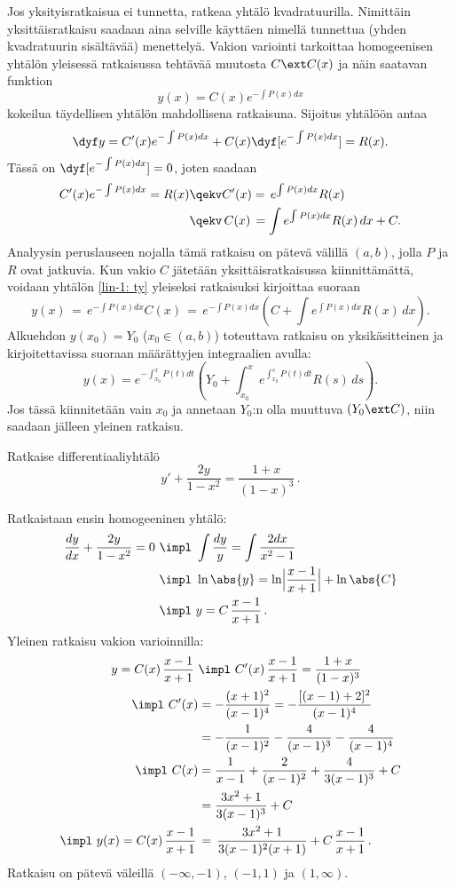 Jos yksityisratkaisua ei tunnetta, ratkeaa yhtälö  kvadratuurilla. Nimittäin 
yksittäisratkaisu saadaan aina selville käyttäen 
 nimellä tunnettua 
(yhden kvadratuurin sisältävää) menettelyä. Vakion variointi tarkoittaa homogeenisen yhtälön
yleisessä ratkaisussa tehtävää muutosta $C \ext C(x)$ ja näin saatavan funktion
\[
y(x)=C(x)e^{-\int P(x)dx}
\]
kokeilua täydellisen yhtälön mahdollisena ratkaisuna. Sijoitus yhtälöön antaa
\[
\dyf y=C'(x)e^{-\int P(x)dx}+C(x)\dyf[e^{-\int P(x)dx}]=R(x).
\]
Tässä on $\dyf[e^{-\int P(x)dx}]=0$, joten saadaan
\begin{align*}
C'(x)e^{-\int P(x)dx} = R(x) &\qekv C'(x)  = \,e^{\int P(x)dx} R(x) \\
                             &\qekv\,C(x)\,= \int e^{\int P(x)dx}R(x)\,dx+C.
\end{align*}
Analyysin peruslauseen nojalla tämä ratkaisu on pätevä välillä $(a,b)$, jolla $P$ ja $R$ ovat
jatkuvia. Kun vakio $C$ jätetään yksittäisratkaisussa kiinnittämättä, voidaan yhtälön
\eqref{lin-1: ty} yleiseksi ratkaisuksi kirjoittaa suoraan
\[
y(x) \,=\, e^{-\int P(x)dx}C(x) \,=\, e^{-\int P(x)dx}\left(C+\int e^{\int P(x)dx}R(x)\,dx\right).
\]
Alkuehdon $y(x_0)=Y_0$ ($x_0\in(a,b)$) toteuttava ratkaisu on yksikäsitteinen ja
kirjoitettavissa suoraan määrättyjen integraalien avulla:
\begin{equation} \label{lin-1: ty-ratk}
y(x)=e^{-\int_{x_0}^x P(t)dt}\left(Y_0+\int_{x_0}^x e^{\int_{x_0}^s P(t)dt}R(s)\,ds\right).
\end{equation}
Jos tässä kiinnitetään vain $x_0$ ja annetaan $Y_0$:n olla muuttuva $(Y_0 \ext C)$, niin saadaan 
jälleen yleinen ratkaisu.
\begin{Exa} Ratkaise differentiaaliyhtälö
\[
y'+\frac{2y}{1-x^2}=\frac{1+x}{(1-x)^3}\,.
\]
\end{Exa}
\ratk Ratkaistaan ensin homogeeninen yhtälö:
\begin{align*}
\frac{dy}{dx}+\frac{2y}{1-x^2}=0 \ &\impl \ \int\frac{dy}{y}=\int\frac{2dx}{x^2-1} \\
&\impl \ \ln\abs{y}=\ln\Bigl|\frac{x-1}{x+1}\Bigr|+\ln\abs{C} \\
&\impl \ y=C\,\frac{x-1}{x+1}\,.
\end{align*}
Yleinen ratkaisu vakion varioinnilla: 
\begin{align*}
y=C(x)\,\frac{x-1}{x+1} \ &\impl \ C'(x)\,\frac{x-1}{x+1}=\frac{1+x}{(1-x)^3} \\
\impl\ C'(x) &= -\frac{(x+1)^2}{(x-1)^4}=-\frac{[(x-1)+2]^2}{(x-1)^4} \\
             &= -\frac{1}{(x-1)^2}-\frac{4}{(x-1)^3}-\frac{4}{(x-1)^4} \\
\impl\ C(x)  &= \frac{1}{x-1}+\frac{2}{(x-1)^2}+\frac{4}{3(x-1)^3}+C \\
             &= \frac{3x^2+1}{3(x-1)^3}+C \\
\impl\ y(x)=C(x)\,\frac{x-1}{x+1}\,
             &=\, \frac{3x^2+1}{3(x-1)^2(x+1)}+C\,\frac{x-1}{x+1}\,.
\end{align*}
Ratkaisu on pätevä väleillä $(-\infty,-1)$, $(-1,1)$ ja $(1,\infty)$. \loppu

